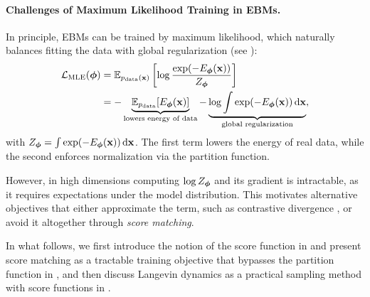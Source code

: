 \paragraph{Challenges of Maximum Likelihood Training in EBMs.}
In principle, EBMs can be trained by maximum likelihood, which naturally balances fitting the data with global regularization (see ):
\begin{align}
\label{eq:mle-ebm}
\mathcal{L}_{\text{MLE}}({\bm{\phi}}) 
&= \mathbb{E}_{p_{\text{data}}({\mathbf{x}})}  \left[ \log \frac{\exp(-E_{{\bm{\phi}}}({\mathbf{x}}))}{Z_{\bm{\phi}}} \right] \\
&= -  \underbrace{\mathbb{E}_{p_{\text{data}}}[E_{{\bm{\phi}}}({\mathbf{x}})]}_{\text{lowers energy of data}}
   -  \underbrace{\log \int \exp(-E_{{\bm{\phi}}}({\mathbf{x}}))\mathop{}\!\mathrm{d}{\mathbf{x}}}_{\text{global regularization}}, \nonumber
\end{align}
with $Z_{\bm{\phi}} = \int \exp(-E_{\bm{\phi}}({\mathbf{x}}))\mathop{}\!\mathrm{d}{\mathbf{x}}$. 
The first term lowers the energy of real data, while the second enforces normalization via the partition function.

However, in high dimensions computing $\log Z_{{\bm{\phi}}}$ and its gradient is intractable, as it requires expectations under the model distribution. 
This motivates alternative objectives that either approximate the term, such as contrastive divergence \citep{hinton2002training}, or avoid it altogether through \emph{score matching}. 

In what follows, we first introduce the notion of the score function in  and present score matching as a tractable training objective that bypasses the partition function in , and then discuss Langevin dynamics as a practical sampling method with score functions in . 












